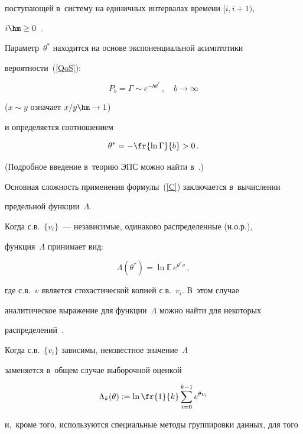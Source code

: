поступающей в~систему на  единичных интервалах времени $[i, i+1)$, 


$i\hm\ge 0$~\cite{BigQueue,Chang,Whitt94}.


Параметр~$\theta^*$ находится на основе  экспоненциальной  асимптотики  


вероятности~(\ref{QoS}):


$$


P_b=\Gamma\sim e^{-b\theta^*}\,,\quad b\to \infty


$$


($x\sim y$ означает $x/y\hm\to 1$)


и определяется соотношением


\begin{equation*}


\theta^*= - \fr{\ln \Gamma}{b} >0\,.




\end{equation*}


 (Подробное введение в~теорию ЭПС можно найти в~\cite{Kelly}.)


Основная сложность применения формулы~(\ref{C}) заключается в~вычислении


предельной функции~$\Lambda$.


 Когда с.в.~$\{v_i\}$~--- независимые, одинаково распределенные (н.о.р.), 


функция~$\Lambda$ принимает вид:


 $$


 \Lambda({\theta}^*) = \ln \mathbb{E}\, e^{{\theta}^* v}\,,


 $$


где с.в.~$v$ является стохастической копией  с.в.~$v_i$. В~этом случае 


аналитическое выражение для функции~$\Lambda$  можно найти  для некоторых 


распределений~\cite{EB14}.


Когда с.в.~$\{v_i\}$ зависимы,  неизвестное значение~$\Lambda$ 


заменяется в~общем случае выборочной оценкой


\begin{equation}


\Lambda_k(\theta):= \ln \fr{1}{k}\sum\limits_{i=0}^{k-1} e^{\theta v_i}


\label{estL}


\end{equation}


и,~кроме того, используются специальные методы группировки данных, для того 


